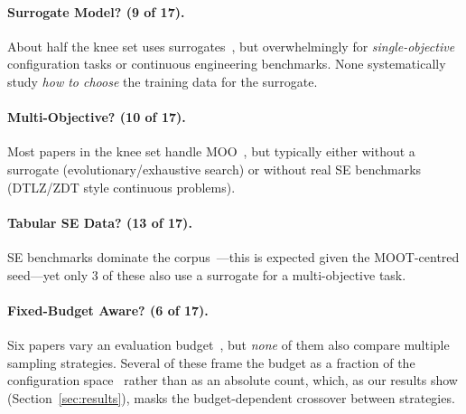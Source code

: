 \documentclass[sigconf,nonacm]{acmart}
\begin{document}
\paragraph{Surrogate Model? (9 of 17).}
About half the knee set uses surrogates~\cite{nair2018finding,wang2020adaptive,zuluaga2013active,siegmund2012predicting,guo2018data,jamshidi2018learning,jin2003evolutionary,ha2019deepperf,valov2017transferring},
but overwhelmingly for \emph{single-objective} configuration tasks or
continuous engineering benchmarks.
None systematically study \emph{how to choose} the training data for the
surrogate.

\paragraph{Multi-Objective? (10 of 17).}
Most papers in the knee set handle MOO~\cite{chen2019sampling,sayyad2013value,nair2018finding,wang2020adaptive,zuluaga2013active,jin2003evolutionary,sarro2017adaptive,krall2015gale,deb2002fast,senthilkumar2025llm},
but typically either without a surrogate (evolutionary/exhaustive search)
or without real SE benchmarks (DTLZ/ZDT style continuous problems).

\paragraph{Tabular SE Data? (13 of 17).}
SE benchmarks dominate the corpus~\cite{chen2019sampling,sayyad2013value,nair2018finding,jamshidi2018learning,siegmund2012predicting,guo2018data,sarro2017adaptive,krall2015gale,ha2019deepperf,kaltenecker2020distance,sarkar2015cost,valov2017transferring,oh2017finding}---this
is expected given the MOOT-centred seed---yet only 3 of these also use a
surrogate for a multi-objective task.

\paragraph{Fixed-Budget Aware? (6 of 17).}
Six papers vary an evaluation budget~\cite{bergstra2012random,siegmund2012predicting,guo2018data,nair2018finding,zuluaga2013active,sarkar2015cost},
but \emph{none} of them also compare multiple sampling strategies.
Several of these frame the budget as a fraction of the configuration
space~\cite{siegmund2012predicting,guo2018data,sarkar2015cost} rather than
as an absolute count, which, as our results show
(Section~\ref{sec:results}), masks the budget-dependent crossover between
strategies.
\end{document}
